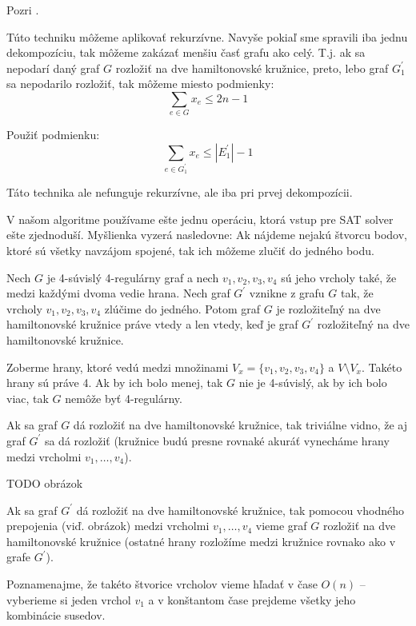 \begin{dokaz}
Pozri \cite{duchenne}.
\end{dokaz}

Túto techniku môžeme aplikovať rekurzívne. Navyše pokiaľ sme spravili iba jednu dekompozíciu, tak
môžeme zakázať menšiu časť grafu ako celý. T.j. ak sa nepodarí daný graf $G$ rozložiť na dve
hamiltonovské kružnice, preto, lebo graf $G_1^{'}$ sa nepodarilo rozložiť, tak môžeme miesto podmienky:
$$\sum_{e \in G} x_e \leq 2n - 1$$

Použiť podmienku:
$$\sum_{e \in G_1^{'}} x_e \leq |E_1^{'}| - 1$$

Táto technika ale nefunguje rekurzívne, ale iba pri prvej dekompozícii.

\medskip

V našom algoritme používame ešte jednu operáciu, ktorá vstup pre SAT solver ešte zjednoduší.
Myšlienka vyzerá nasledovne: Ak nájdeme nejakú štvorcu bodov, ktoré sú všetky navzájom spojené, tak
ich môžeme zlučiť do jedného bodu.

\begin{veta}
Nech $G$ je 4-súvislý 4-regulárny graf a nech $v_1, v_2, v_3, v_4$ sú jeho vrcholy také, že medzi
každými dvoma vedie hrana. Nech graf $G^{'}$ vznikne z grafu $G$ tak, že vrcholy $v_1, v_2, v_3,
v_4$ zlúčime do jedného. Potom graf $G$ je rozložiteľný na dve hamiltonovské kružnice práve vtedy a
len vtedy, keď je graf $G^{'}$ rozložiteľný na dve hamiltonovské kružnice.
\end{veta}

\begin{dokaz}
Zoberme hrany, ktoré vedú medzi množinami $V_x = \{v_1, v_2, v_3, v_4\}$ a $V \setminus V_x$.
Takéto hrany sú práve 4. Ak by ich bolo menej, tak $G$ nie je 4-súvislý, ak by ich bolo viac, tak
$G$ nemôže byť 4-regulárny.

Ak sa graf $G$ dá rozložiť na dve hamiltonovské kružnice, tak triviálne vidno, že aj graf $G^{'}$ sa
dá rozložiť (kružnice budú presne rovnaké akuráť vynecháme hrany medzi vrcholmi $v_1, \dots, v_4$).

TODO obrázok

Ak sa graf $G^{'}$ dá rozložiť na dve hamiltonovské kružnice, tak pomocou vhodného prepojenia (viď.
obrázok) medzi
vrcholmi $v_1, \dots, v_4$ vieme graf $G$ rozložiť na dve hamiltonovské kružnice (ostatné hrany
rozložíme medzi kružnice rovnako ako v grafe $G^{'}$).
\end{dokaz}

Poznamenajme, že takéto štvorice vrcholov vieme hľadať v čase $O(n)$ -- vyberieme si jeden vrchol
$v_1$ a v konštantom čase prejdeme všetky jeho kombinácie susedov.


